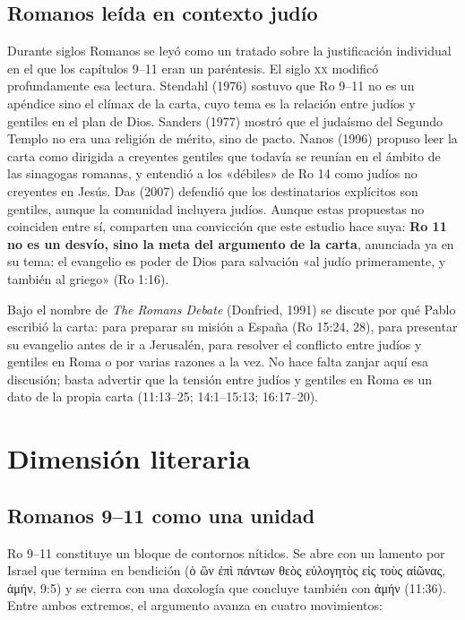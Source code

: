 \documentclass[11pt,letterpaper]{article}
\newcommand{\grc}[1]{\foreignlanguage{ancientgreek}{#1}}
\newcommand{\destacar}[1]{\textbf{\textcolor{ladrillo}{#1}}}
\begin{document}
\subsection{Romanos leída en contexto judío}
Durante siglos Romanos se leyó como un tratado sobre la justificación individual en el que los capítulos 9--11 eran un paréntesis. El siglo \textsc{xx} modificó profundamente esa lectura. Stendahl (1976) sostuvo que Ro 9--11 no es un apéndice sino el clímax de la carta, cuyo tema es la relación entre judíos y gentiles en el plan de Dios. Sanders (1977) mostró que el judaísmo del Segundo Templo no era una religión de mérito, sino de pacto. Nanos (1996) propuso leer la carta como dirigida a creyentes gentiles que todavía se reunían en el ámbito de las sinagogas romanas, y entendió a los «débiles» de Ro 14 como judíos no creyentes en Jesús. Das (2007) defendió que los destinatarios explícitos son gentiles, aunque la comunidad incluyera judíos. Aunque estas propuestas no coinciden entre sí, comparten una convicción que este estudio hace suya: \destacar{Ro 11 no es un desvío, sino la meta del argumento de la carta}, anunciada ya en su tema: el evangelio es poder de Dios para salvación «al judío primeramente, y también al griego» (Ro 1:16).

\begin{nota}
Bajo el nombre de \emph{The Romans Debate} (Donfried, 1991) se discute por qué Pablo escribió la carta: para preparar su misión a España (Ro 15:24, 28), para presentar su evangelio antes de ir a Jerusalén, para resolver el conflicto entre judíos y gentiles en Roma o por varias razones a la vez. No hace falta zanjar aquí esa discusión; basta advertir que la tensión entre judíos y gentiles en Roma es un dato de la propia carta (11:13--25; 14:1--15:13; 16:17--20).
\end{nota}

\section{Dimensión literaria}

\subsection{Romanos 9--11 como una unidad}
Ro 9--11 constituye un bloque de contornos nítidos. Se abre con un lamento por Israel que termina en bendición (\grc{ὁ ὢν ἐπὶ πάντων θεὸς εὐλογητὸς εἰς τοὺς αἰῶνας, ἀμήν}, 9:5) y se cierra con una doxología que concluye también con \grc{ἀμήν} (11:36). Entre ambos extremos, el argumento avanza en cuatro movimientos:
\end{document}
